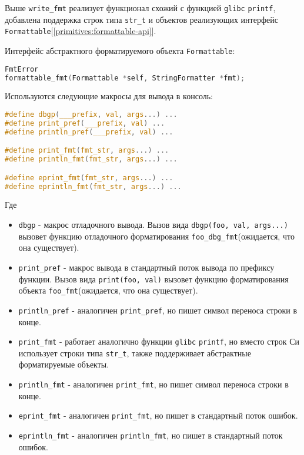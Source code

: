 \begin{itemize}
Выше \verb|write_fmt| реализует функционал схожий с функцией \verb|glibc| \verb|printf|, 
добавлена поддержка строк типа \verb|str_t| и объектов реализующих интерфейс \verb|Formattable|[\ref{primitives:formattable-api}].

Интерфейс абстрактного форматируемого объекта \verb|Formattable|:
\begin{lstlisting}[language=c, caption={Интерфейс абстрактного форматируемого объекта}, label={primitives:formattable-api}]
FmtError 
formattable_fmt(Formattable *self, StringFormatter *fmt);
\end{lstlisting}


Используются следующие макросы для вывода в консоль:
\begin{lstlisting}[language=c, caption={Макросы для вывода в консоль}, label={primitives:print-macros}]
#define dbgp(___prefix, val, args...) ...
#define print_pref(___prefix, val) ...
#define println_pref(___prefix, val) ...

#define print_fmt(fmt_str, args...) ...                                 
#define println_fmt(fmt_str, args...) ...                               

#define eprint_fmt(fmt_str, args...) ...                                
#define eprintln_fmt(fmt_str, args...) ...                              
\end{lstlisting}

Где
\begin{itemize}
    \item \verb|dbgp| - макрос отладочного вывода. Вызов вида \verb|dbgp(foo, val, args...)| вызовет функцию отладочного форматирования \verb|foo_dbg_fmt|(ожидается, что она существует).
    \item \verb|print_pref| - макрос вывода в стандартный поток вывода по префиксу функции. Вызов вида \verb|print(foo, val)| вызовет функцию форматирования объекта \verb|foo_fmt|(ожидается, что она существует).
    \item \verb|println_pref| - аналогичен \verb|print_pref|, но пишет символ переноса строки в конце.

    \item \verb|print_fmt| - работает аналогично функции \verb|glibc| \verb|printf|, но вместо строк Си использует строки типа \verb|str_t|, также поддерживает абстрактные форматируемые объекты.
    \item \verb|println_fmt| - аналогичен \verb|print_fmt|, но пишет символ переноса строки в конце.
    
    \item \verb|eprint_fmt| - аналогичен \verb|print_fmt|, но пишет в стандартный поток ошибок.
    \item \verb|eprintln_fmt| - аналогичен \verb|println_fmt|, но пишет в стандартный поток ошибок.
\end{itemize}


\end{itemize}

